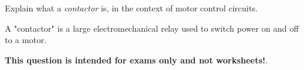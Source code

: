 

Explain what a {\it contactor} is, in the context of motor control circuits.







A "contactor" is a large electromechanical relay used to switch power on and off to a motor.







{\bf This question is intended for exams only and not worksheets!}.




